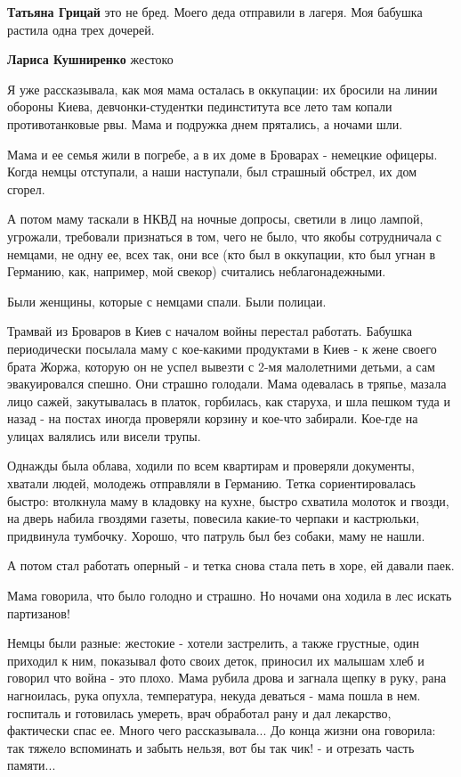 \begin{itemize}
\begin{itemize}
\begin{itemize}
\textbf{Татьяна Грицай} это не бред. Моего деда отправили в лагеря. Моя бабушка растила одна трех дочерей.

\textbf{Лариса Кушниренко} жестоко
\end{itemize} %


Я уже рассказывала, как моя мама осталась в оккупации: их бросили на линии
обороны Киева, девчонки-студентки пединститута все лето там копали
противотанковые рвы. Мама и подружка днем прятались, а ночами шли.

Мама и ее семья жили в погребе, а в их доме в Броварах - немецкие офицеры.
Когда немцы отступали, а наши наступали, был страшный обстрел, их дом сгорел.

А потом маму таскали в НКВД на ночные допросы, светили в лицо лампой, угрожали,
требовали признаться в том, чего не было, что якобы сотрудничала с немцами, не
одну ее, всех так, они все (кто был в оккупации, кто был угнан в Германию, как,
например, мой свекор) считались неблагонадежными.

Были женщины, которые с немцами спали. Были полицаи.

Трамвай из Броваров в Киев с началом войны перестал работать. Бабушка
периодически посылала маму с кое-какими продуктами в Киев - к жене своего брата
Жоржа, которую он не успел вывезти с 2-мя малолетними детьми, а сам
эвакуировался спешно. Они страшно голодали. Мама одевалась в тряпье, мазала
лицо сажей, закутывалась в платок, горбилась, как старуха, и шла пешком туда и
назад - на постах иногда проверяли корзину и кое-что забирали. Кое-где на
улицах валялись или висели трупы.

Однажды была облава, ходили по всем квартирам и проверяли документы, хватали
людей, молодежь отправляли в Германию. Тетка сориентировалась быстро: втолкнула
маму в кладовку на кухне, быстро схватила молоток и гвозди, на дверь набила
гвоздями газеты, повесила какие-то черпаки и кастрюльки, придвинула тумбочку.
Хорошо, что патруль был без собаки, маму не нашли.

А потом стал работать оперный - и тетка снова стала петь в хоре, ей давали
паек.

Мама говорила, что было голодно и страшно. Но ночами она ходила в лес искать
партизанов!

Немцы были разные: жестокие - хотели застрелить, а также грустные, один
приходил к ним, показывал фото своих деток, приносил их малышам хлеб и говорил
что война - это плохо. Мама рубила дрова и загнала щепку в руку, рана
нагноилась, рука опухла, температура, некуда деваться - мама пошла в нем.
госпиталь и готовилась умереть, врач обработал рану и дал лекарство, фактически
спас ее. Много чего рассказывала... До конца жизни она говорила: так тяжело
вспоминать и забыть нельзя, вот бы так чик! - и отрезать часть памяти...


\end{itemize}
\end{itemize}
